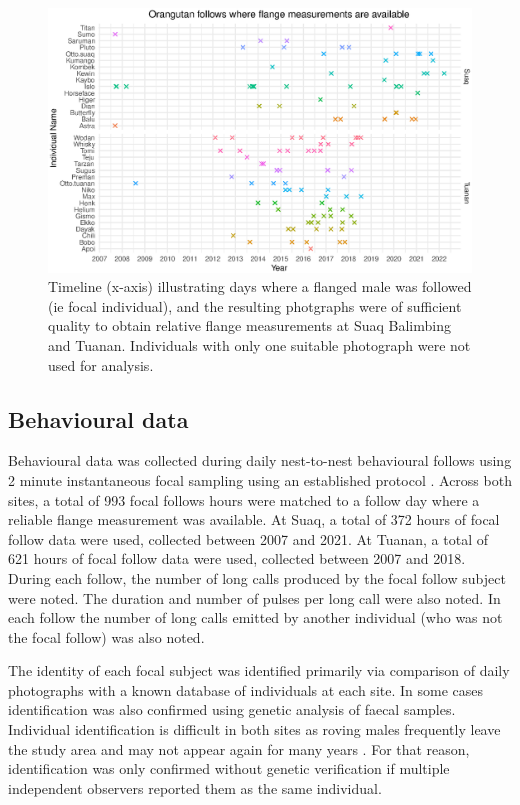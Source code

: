 \begin{figure}
\centering
\includegraphics[width=1\linewidth]{Chapter3/Figs/sightings_plot.eps}
\caption{Timeline (x-axis) illustrating days where a flanged male was followed (ie focal individual), and the resulting photgraphs were of sufficient quality to obtain relative flange measurements at Suaq Balimbing and Tuanan. Individuals with only one suitable photograph were not used for analysis.}
\label{fig:orangutan_sightings_with_measurements}
\end{figure}

\subsection{Behavioural data}
Behavioural data was collected during daily nest-to-nest behavioural follows using 2 minute instantaneous focal sampling using an established protocol \citep{OU_methods}. Across both sites, a total of 993 focal follows hours were matched to a follow day where a reliable flange measurement was available. At Suaq, a total of 372 hours of focal follow data were used, collected between 2007 and 2021. At Tuanan, a total of 621 hours of focal follow data were used, collected between 2007 and 2018. During each follow, the number of long calls produced by the focal follow subject were noted. The duration and number of pulses per long call were also noted. In each follow the number of long calls emitted by another individual (who was not the focal follow) was also noted.

The identity of each focal subject was identified primarily via comparison of daily photographs with a known database of individuals at each site. In some cases identification was also confirmed using genetic analysis of faecal samples. Individual identification is difficult in both sites as roving males frequently leave the study area and may not appear again for many years \citep{Kunz.2023,Mörchen.2023}. For that reason, identification was only confirmed without genetic verification if multiple independent observers reported them as the same individual.

